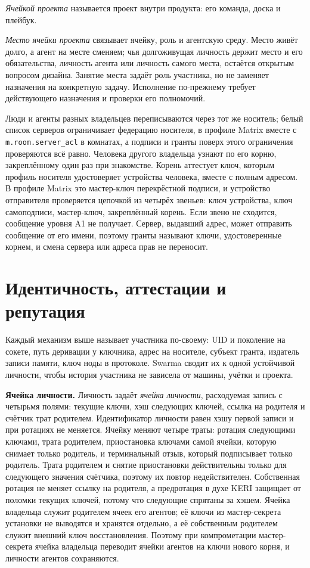 \documentclass[10pt,a4paper]{article}
\begin{document}
\emph{Ячейкой проекта} называется проект внутри продукта: его команда, доска и плейбук.

\emph{Место ячейки проекта} связывает ячейку, роль и агентскую среду. Место живёт долго, а агент на месте сменяем; чья долгоживущая личность держит место и его обязательства, личность агента или личность самого места, остаётся открытым вопросом дизайна. Занятие места задаёт роль участника, но не заменяет назначения на конкретную задачу. Исполнение по-прежнему требует действующего назначения и проверки его полномочий.

Люди и агенты разных владельцев переписываются через тот же носитель; белый список серверов ограничивает федерацию носителя, в профиле Matrix вместе с \texttt{m.room.server\_acl} в комнатах, а подписи и гранты поверх этого ограничения проверяются всё равно. Человека другого владельца узнают по его корню, закреплённому один раз при знакомстве. Корень аттестует ключ, которым профиль носителя удостоверяет устройства человека, вместе с полным адресом. В профиле Matrix это мастер-ключ перекрёстной подписи, и устройство отправителя проверяется цепочкой из четырёх звеньев: ключ устройства, ключ самоподписи, мастер-ключ, закреплённый корень. Если звено не сходится, сообщение уровня A1 не получает. Сервер, выдавший адрес, может отправить сообщение от его имени, поэтому гранты называют ключи, удостоверенные корнем, и смена сервера или адреса прав не переносит.

\section{Идентичность, аттестации и репутация}
\label{sec:identity}

Каждый механизм выше называет участника по-своему: UID и поколение на сокете, путь деривации у ключника, адрес на носителе, субъект гранта, издатель записи памяти, ключ ноды в протоколе. Swarma сводит их к одной устойчивой личности, чтобы история участника не зависела от машины, учётки и проекта.

\textbf{Ячейка личности.} Личность задаёт \emph{ячейка личности}, расходуемая запись с четырьмя полями: текущие ключи, хэш следующих ключей, ссылка на родителя и счётчик трат родителем. Идентификатор личности равен хэшу первой записи и при ротациях не меняется. Ячейку меняют четыре траты: ротация следующими ключами, трата родителем, приостановка ключами самой ячейки, которую снимает только родитель, и терминальный отзыв, который подписывает только родитель. Трата родителем и снятие приостановки действительны только для следующего значения счётчика, поэтому их повтор недействителен. Собственная ротация не меняет ссылку на родителя, а предротация в духе KERI \cite{keri} защищает от поломки текущих ключей, потому что следующие спрятаны за хэшем. Ячейка владельца служит родителем ячеек его агентов; её ключи из мастер-секрета установки не выводятся и хранятся отдельно, а её собственным родителем служит внешний ключ восстановления. Поэтому при компрометации мастер-секрета ячейка владельца переводит ячейки агентов на ключи нового корня, и личности агентов сохраняются.
\end{document}
